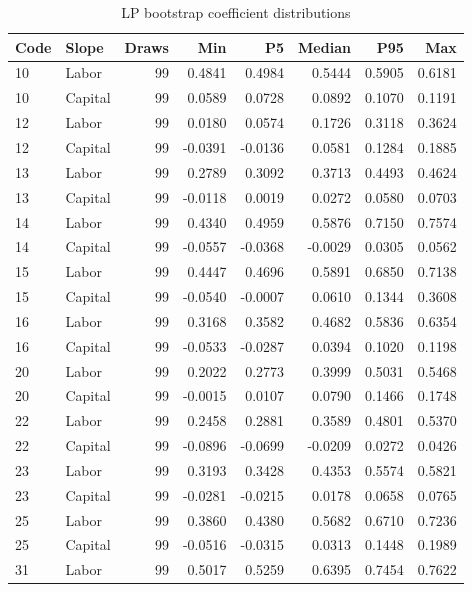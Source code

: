 \begin{table}[H]
\centering
\caption{LP bootstrap coefficient distributions}
\begingroup\fontsize{9.2}{11.2}\selectfont
\setlength{\tabcolsep}{4.3pt}\renewcommand{\arraystretch}{1.1}
\begin{tabular}{llrrrrrr}
\toprule
Code & Slope & Draws & Min & P5 & Median & P95 & Max \\
\midrule
10 & Labor & 99 & 0.4841 & 0.4984 & 0.5444 & 0.5905 & 0.6181 \\
10 & Capital & 99 & 0.0589 & 0.0728 & 0.0892 & 0.1070 & 0.1191 \\
12 & Labor & 99 & 0.0180 & 0.0574 & 0.1726 & 0.3118 & 0.3624 \\
12 & Capital & 99 & -0.0391 & -0.0136 & 0.0581 & 0.1284 & 0.1885 \\
13 & Labor & 99 & 0.2789 & 0.3092 & 0.3713 & 0.4493 & 0.4624 \\
13 & Capital & 99 & -0.0118 & 0.0019 & 0.0272 & 0.0580 & 0.0703 \\
14 & Labor & 99 & 0.4340 & 0.4959 & 0.5876 & 0.7150 & 0.7574 \\
14 & Capital & 99 & -0.0557 & -0.0368 & -0.0029 & 0.0305 & 0.0562 \\
15 & Labor & 99 & 0.4447 & 0.4696 & 0.5891 & 0.6850 & 0.7138 \\
15 & Capital & 99 & -0.0540 & -0.0007 & 0.0610 & 0.1344 & 0.3608 \\
16 & Labor & 99 & 0.3168 & 0.3582 & 0.4682 & 0.5836 & 0.6354 \\
16 & Capital & 99 & -0.0533 & -0.0287 & 0.0394 & 0.1020 & 0.1198 \\
20 & Labor & 99 & 0.2022 & 0.2773 & 0.3999 & 0.5031 & 0.5468 \\
20 & Capital & 99 & -0.0015 & 0.0107 & 0.0790 & 0.1466 & 0.1748 \\
22 & Labor & 99 & 0.2458 & 0.2881 & 0.3589 & 0.4801 & 0.5370 \\
22 & Capital & 99 & -0.0896 & -0.0699 & -0.0209 & 0.0272 & 0.0426 \\
23 & Labor & 99 & 0.3193 & 0.3428 & 0.4353 & 0.5574 & 0.5821 \\
23 & Capital & 99 & -0.0281 & -0.0215 & 0.0178 & 0.0658 & 0.0765 \\
25 & Labor & 99 & 0.3860 & 0.4380 & 0.5682 & 0.6710 & 0.7236 \\
25 & Capital & 99 & -0.0516 & -0.0315 & 0.0313 & 0.1448 & 0.1989 \\
31 & Labor & 99 & 0.5017 & 0.5259 & 0.6395 & 0.7454 & 0.7622 \\

\end{tabular}
\end{table}
